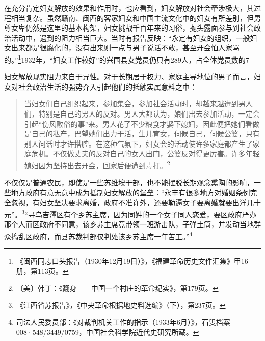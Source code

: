 在充分肯定妇女解放的效果和作用时，也应看到，妇女解放对社会牵涉极大，其过程相当复杂。虽然赣南、闽西的客家妇女和中国主流文化中的妇女有所差别，但男尊女卑仍然是这里的基本构架，妇女挑战千百年来的习俗，抛头露面参与到社会政治活动中，遇到的阻力相当巨大。当时有报告反映：“永定有妇女的组织，一般妇女出来都是很腐化的，没有出来则一点与男子说话不敢，甚至开会怕人家骂的。”\footnote{《闽西同志口头报告（1930年12月19日）》，《福建革命历史文件汇集》甲16册，第113页。}1932年，“妇女工作较好”的兴国县女党员仍只有289人，占全体党员数的7%


妇女解放现实阻力来自于异性。对于长期居于权力、家庭主导地位的男子而言，妇女对社会政治生活的强势介入引起他们的抵触实属意料之中：

\begin{quote}

当妇女们自己组织起来，参加集会，参加社会活动时，却越来越遭到男人们，特别是自己的男人的反对。男人大都认为，娘们出去参加活动，一定会引起“伤风败俗的事”来。男人花了不少粮食才娶下媳妇，因此便把她们看做是自己的私产，巴望她们出力干活，生儿育女，伺候自己，伺候公婆，只有别人问话时才许搭腔。在这种气氛下，妇女会的活动使许多家庭都产生了家庭危机。不仅做丈夫的反对自己的女人出门，公婆反对得更厉害。许多年轻媳妇因为坚持出去开会，回家后便遭到毒打。\footnote{〔美〕韩丁：《翻身——中国一个村庄的革命纪实》，第179页。}
\end{quote}


不仅仅是普通农民，即使是一些苏维埃干部，也不能摆脱长期观念熏陶的影响，一些地方政府有意无意中成为抵制妇女解放的堡垒：“永丰有很多地方对婚姻条例完全忽视，有妇女坚决要求离婚，政府不准许外，还要勒逼女子要离婚就要出洋几十元”。\footnote{《江西省苏报告》，《中央革命根据地史料选编》（下），第237页。}“寻乌吉潭区有个乡苏主席，因为同姓的一个女子同人恋爱，要区政府严办那个人而区政府不同意，该乡苏主席竟带领一班游击队，子弹土筒，并发动当地群众捣乱区政府，而县苏裁判部仅判处该乡苏主席一年苦工。”\footnote{司法人民委员部：《对裁判机关工作的指示（1933年6月）》，石叟档案008·548/3449/0759，中国社会科学院近代史研究所藏。}


